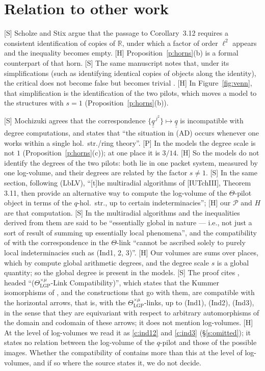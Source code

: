 \documentclass[11pt]{article}
\theoremstyle{plain}
\theoremstyle{definition}
\theoremstyle{remark}
\newcommand{\Smark}{\textup{[S]}}
\newcommand{\Pmark}{\textup{[P]}}
\newcommand{\Hmark}{\textup{[H]}}
\newcommand{\Poss}{\mathcal P}
\newcommand{\qbb}{\underline{\underline q}}
\begin{document}
\section{Relation to other work}\label{s:rel}

\Smark{} Scholze and Stix \cite{SS} argue that the passage to Corollary~3.12 requires a
consistent identification of copies of $\mathbb R$, under which a factor of order $\ell^2$
appears and the inequality becomes empty. \Hmark{} Proposition~\ref{p:horns}(b) is a
formal counterpart of that horn. \Smark{} The same manuscript notes that, under its
simplifications (such as identifying identical copies of objects along the identity), the
critical \cite[Thm.~3.11]{IUT3} does not become false but becomes trivial
\cite[footnote~12]{SS}. \Hmark{} In Figure~\ref{fig:venn}, that simplification is the
identification of the two pilots, which moves a model to the structures with $s=1$
(Proposition~\ref{p:horns}(b)).

\Smark{} Mochizuki \cite[\S12]{Rpt} agrees that the correspondence
$\{\qbb^{\,j^2}\}\mapsto\qbb$ is incompatible with degree computations, and states that
``the situation in (AD) occurs whenever one works within a single hol.\ str./ring
theory''. \Pmark{} In the models the degree scale is not $1$
(Proposition~\ref{p:horns}(c)); at one place it is $3/14$. \Hmark{} So the models do not
identify the degrees of the two pilots: both lie in one packet system, measured by one
log-volume, and their degrees are related by the factor $s\ne1$. \Smark{} In the same
section, following (LbLV), ``[t]he multiradial algorithms of [IUTchIII], Theorem 3.11, then
provide an alternative way to compute the log-volume of the $\Theta$-pilot object in terms
of the $q$-hol.\ str., up to certain indeterminacies''; \Hmark{} our $\Poss$ and $H$ are
that computation. \Smark{} In \cite[\S11]{Rpt} the multiradial algorithms and the inequalities
derived from them are said to be ``essentially global in nature --- i.e., not just a sort
of result of summing up essentially local phenomena'', and the compatibility of
\cite[Thm.~3.11]{IUT3} with the correspondence in the $\Theta$-link ``cannot be ascribed
solely to purely local indeterminacies such as (Ind1, 2, 3)''. \Hmark{} Our volumes are
sums over places, which by \cite[Prop.~3.9(iii)]{IUT3} compute global arithmetic degrees,
and the degree scale $s$ is a global quantity; so the global degree is present in the
models. \Smark{} The proof cites \cite[Thm.~3.11(iii)]{IUT3}, headed
``($\Theta^{\times\mu}_{\mathrm{LGP}}$-Link Compatibility)'', which states that the
Kummer isomorphisms of \cite[Thm.~3.11(ii)]{IUT3}, and the constructions that go with them,
are compatible with the horizontal arrows,
that is, with the $\Theta^{\times\mu}_{\mathrm{LGP}}$-links, up to (Ind1), (Ind2), (Ind3),
in the sense that they are equivariant with respect to arbitrary automorphisms of the
domain and codomain of these arrows; it does not mention log-volumes. \Hmark{} At the level
of log-volumes we read it as \ref{c:ind12} and \ref{c:ind3} (\S\ref{s:omitted}); it states
no relation between the log-volume of the $q$-pilot and those of the possible images.
Whether the compatibility of \cite[\S11]{Rpt} contains more than this at the level of
log-volumes, and if so where the source states it, we do not decide.
\end{document}
